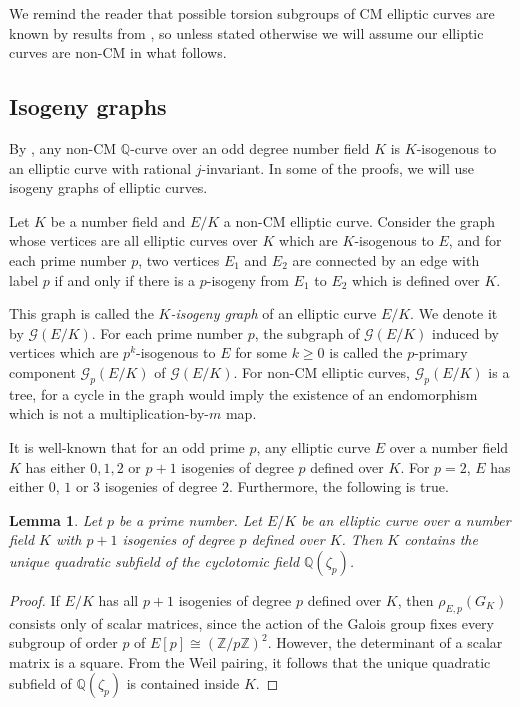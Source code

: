 \documentclass[10pt,leqno]{amsart}
\newcommand{\Z}{\mathbb{Z}}
\newcommand{\Q}{\mathbb{Q}}
\newtheorem{lemma}[theorem]{Lemma}
\theoremstyle{definition}
\theoremstyle{remark}
\numberwithin{theorem}{section}
\begin{document}
We remind the reader that possible torsion subgroups of CM elliptic curves are known by results from \cite{CMcase}, so unless stated otherwise we will assume our elliptic curves are non-CM in what follows.

\subsection{Isogeny graphs}

By , any non-CM $\Q$-curve over an odd degree number field $K$ is $K$-isogenous to an elliptic curve with rational $j$-invariant. In some of the proofs, we will use isogeny graphs of elliptic curves. 

Let $K$ be a number field and $E/K$ a non-CM elliptic curve. Consider the graph whose vertices are all elliptic curves over $K$ which are $K$-isogenous to $E$, and for each prime number $p$, two vertices $E_1$ and $E_2$ are connected by an edge with label $p$ if and only if there is a $p$-isogeny from $E_1$ to $E_2$ which is defined over $K$. 

This graph is called the \emph{$K$-isogeny graph} of an elliptic curve $E/K$. We denote it by $\mathcal G(E/K)$. For each prime number $p$, the subgraph of $\mathcal G(E/K)$ induced by vertices which are $p^k$-isogenous to $E$ for some $k\geq 0$ is called the $p$-primary component $\mathcal G_p(E/K)$ of $\mathcal G(E/K)$. For non-CM elliptic curves, $\mathcal G_p(E/K)$ is a tree, for a cycle in the graph would imply the existence of an endomorphism which is not a multiplication-by-$m$ map.

It is well-known that for an odd prime $p$, any elliptic curve $E$ over a number field $K$ has either $0, 1, 2$ or $p+1$ isogenies of degree $p$ defined over $K$. For $p=2$, $E$ has either $0$, $1$ or $3$ isogenies of degree $2$. Furthermore, the following is true.
\begin{lemma}\label{zetap}
    Let $p$ be a prime number. Let $E/K$ be an elliptic curve over a number field $K$ with $p+1$ isogenies of degree $p$ defined over $K$. Then $K$ contains the unique quadratic subfield of the cyclotomic field $\Q(\zeta_p)$. 
\end{lemma}
\begin{proof}
    If $E/K$ has all $p+1$ isogenies of degree $p$ defined over $K$, then $\rho_{E, p}(G_K)$ consists only of scalar matrices, since the action of the Galois group fixes every subgroup of order $p$ of $E[p]\cong (\Z/p\Z)^2$. However, the determinant of a scalar matrix is a square. From the Weil pairing, it follows that the unique quadratic subfield of $\Q(\zeta_p)$ is contained inside $K$.
\end{proof}
\end{document}
